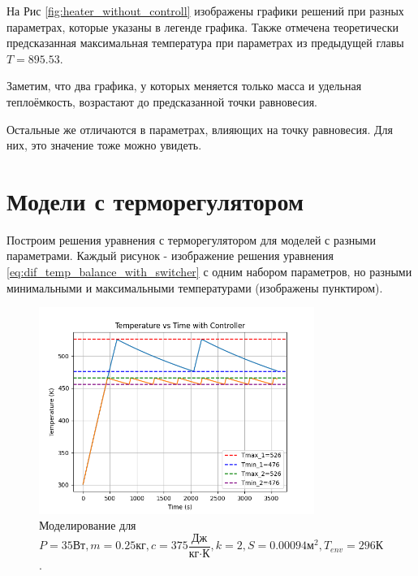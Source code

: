 На Рис \ref{fig:heater_without_controll} изображены графики решений при разных параметрах, которые указаны в легенде графика. Также отмечена теоретически предсказанная максимальная температура при параметрах из предыдущей главы $T = 895.53$.

Заметим, что два графика, у которых меняется только масса и удельная теплоёмкость, возрастают до предсказанной точки равновесия.

Остальные же отличаются в параметрах, влияющих на точку равновесия. Для них, это значение тоже можно увидеть.

\section{Модели с терморегулятором}

Построим решения уравнения с терморегулятором для моделей с разными параметрами.
Каждый рисунок - изображение решения уравнения \ref{eq:dif_temp_balance_with_switcher} с одним набором параметров, но разными минимальными и максимальными температурами (изображены пунктиром).
\begin{figure}[h]  %
	\centering
	\includegraphics[width=0.8\textwidth]{imgs/heater_w._controll_3.png}  %
	\caption{Моделирование для 
		\[
		P=35\text{Вт}, m = 0.25\text{кг}, c=375\frac{\text{Дж}}{\text{кг}\cdot\text{К}},k = 2, S = 0.00094 \text{м}^2,T_{env}= 296 \text{К}
		\].}  %
	\label{fig:heater_with_controll_3}  
\end{figure}
\newpage
